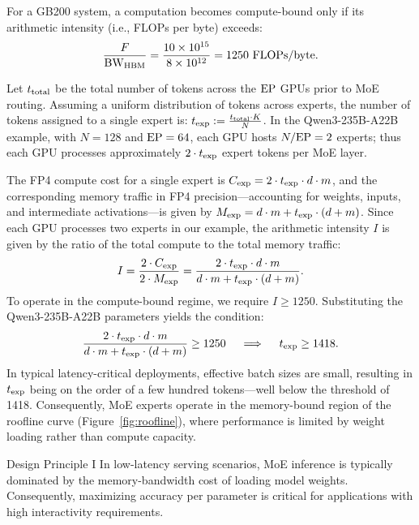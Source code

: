 For a GB200 system, a computation becomes compute-bound only if its arithmetic intensity (i.e., FLOPs per byte) exceeds:
\begin{equation*}
\frac{F}{\mathrm{BW}_\mathrm{HBM}} = \frac{10 \times 10^{15}}{8 \times 10^{12}} = 1250 \text{ FLOPs/byte}.
\end{equation*}

Let $t_\mathrm{total}$ be the total number of tokens across the $\mathrm{EP}$ GPUs prior to MoE routing. Assuming a uniform distribution of tokens across experts, the number of tokens assigned to a single expert is: $t_\mathrm{exp} := \frac{t_\mathrm{total} \cdot K}{N}$. In the Qwen3-235B-A22B example, with $N = 128$ and $\mathrm{EP} = 64$, each GPU hosts $N / \mathrm{EP} = 2$ experts; thus each GPU processes approximately $2 \cdot t_\mathrm{exp}$ expert tokens per MoE layer.

The FP4 compute cost for a single expert is $C_{\mathrm{exp}} = 2 \cdot t_\mathrm{exp} \cdot d \cdot m$, and the corresponding memory traffic in FP4 precision---accounting for weights, inputs, and intermediate activations---is given by $M_{\mathrm{exp}} = d \cdot m + t_\mathrm{exp} \cdot (d + m)$. Since each GPU processes two experts in our example, the arithmetic intensity $I$ is given by the ratio of the total compute to the total memory traffic:
\begin{equation*}
I = \frac{2 \cdot C_{\mathrm{exp}}}{2 \cdot M_{\mathrm{exp}}} = \frac{2 \cdot t_\mathrm{exp} \cdot d \cdot m}{d \cdot m + t_\mathrm{exp} \cdot (d + m)}.
\end{equation*}
To operate in the compute-bound regime, we require $I \ge 1250$. Substituting the Qwen3-235B-A22B parameters yields the condition:
\begin{equation*}
\frac{2 \cdot t_\mathrm{exp} \cdot d \cdot m}{d \cdot m + t_\mathrm{exp} \cdot (d + m)} \ge 1250 \quad \implies \quad t_\mathrm{exp} \ge 1418.
\end{equation*}
In typical latency-critical deployments, effective batch sizes are small, resulting in $t_\mathrm{exp}$ being on the order of a few hundred tokens—well below the threshold of 1418. Consequently, MoE experts operate in the memory-bound region of the roofline curve (Figure~\ref{fig:roofline}), where performance is limited by weight loading rather than compute capacity.

\begin{notebox}{Design Principle I}
In low-latency serving scenarios, MoE inference is typically dominated by the memory-bandwidth cost of loading model weights. Consequently, maximizing accuracy per parameter is critical for applications with high interactivity requirements.
\end{notebox}


